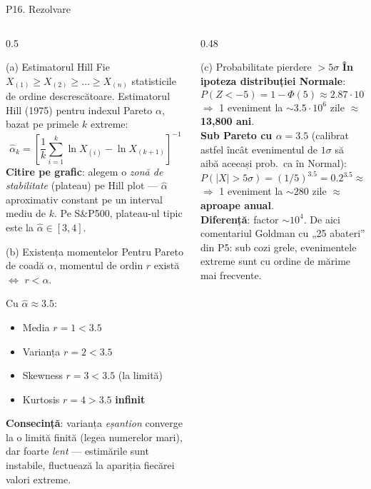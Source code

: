 \documentclass[9pt, aspectratio=169, t]{beamer}
\begin{document}
\begin{frame}[shrink=35]{P16. Rezolvare}
\begin{columns}[T]
\begin{column}{0.5\textwidth}
\begin{block}{(a) Estimatorul Hill}
Fie $X_{(1)}\geq X_{(2)}\geq \dots\geq X_{(n)}$ statisticile de ordine descrescătoare. Estimatorul Hill (1975) pentru indexul Pareto $\alpha$, bazat pe primele $k$ extreme:
\[
\hat\alpha_k = \left[\frac{1}{k}\sum_{i=1}^{k}\ln X_{(i)} - \ln X_{(k+1)}\right]^{-1}
\]
\textbf{Citire pe grafic}: alegem o \emph{zonă de stabilitate} (plateau) pe Hill plot --- $\hat\alpha$ aproximativ constant pe un interval mediu de $k$. Pe S\&P500, plateau-ul tipic este la $\hat\alpha\in[3,4]$.
\end{block}
\begin{block}{(b) Existența momentelor}
Pentru Pareto de coadă $\alpha$, momentul de ordin $r$ există $\Leftrightarrow$ $r<\alpha$.

Cu $\hat\alpha\approx 3.5$:
\begin{itemize}\setlength{\itemsep}{0pt}
\item Media $r=1<3.5$ \correct
\item Varianța $r=2<3.5$ \correct
\item Skewness $r=3<3.5$ \correct (la limită)
\item Kurtosis $r=4>3.5$ \incorrect{} \textbf{infinit}
\end{itemize}
\textbf{Consecință}: varianța \emph{eșantion} converge la o limită finită (legea numerelor mari), dar foarte \emph{lent} --- estimările sunt instabile, fluctuează la apariția fiecărei valori extreme.
\end{block}
\end{column}
\begin{column}{0.48\textwidth}
\begin{block}{(c) Probabilitate pierdere $>5\sigma$}
\textbf{În ipoteza distribuției Normale}:
\[
P(Z<-5) = 1 - \Phi(5) \approx 2.87\cdot 10^{-7}
\]
$\Rightarrow$ 1 eveniment la $\sim 3.5\cdot 10^6$ zile $\approx$ \textbf{13{,}800 ani}.
\\[0.2em]
\textbf{Sub Pareto cu $\alpha=3.5$} (calibrat astfel încât evenimentul de $1\sigma$ să aibă aceeași prob.\ ca în Normal):
\[
P(|X|>5\sigma) = (1/5)^{3.5} = 0.2^{3.5} \approx 0.00358
\]
$\Rightarrow$ 1 eveniment la $\sim 280$ zile $\approx$ \textbf{aproape anual}.
\\[0.4em]
\textbf{Diferență}: factor $\sim 10^4$. De aici comentariul Goldman cu „25 abateri'' din P5: sub cozi grele, evenimentele extreme sunt cu ordine de mărime mai frecvente.
\end{block}
\end{column}
\end{columns}
\end{frame}
\end{document}
